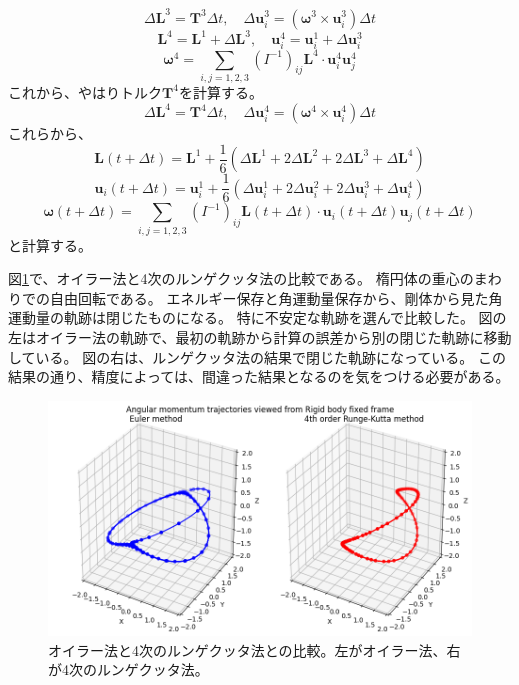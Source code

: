 \documentclass[a4paper,11pt]{jbook}
\begin{document}
\begin{equation}
\Delta \bm{L}^3=\bm{T}^3\Delta t, \quad \Delta\bm{u}_i^3=(\bm{\omega}^3\times\bm{u}_i^3)\Delta t
\end{equation}
\begin{equation}
\bm{L}^4=\bm{L}^1+\Delta \bm{L}^3,\quad\bm{u}_i^4=\bm{u}_i^1+\Delta\bm{u}_i^3
\end{equation}
\begin{equation}
 \bm{\omega}^4=\sum_{i,j=1,2,3}(I^{-1})_{ij}\bm{L}^4\cdot\bm{u}_i^4\bm{u}_j^4
\end{equation}
これから、やはりトルク$\bm{T}^4$を計算する。
\begin{equation}
\Delta \bm{L}^4=\bm{T}^4\Delta t, \quad \Delta\bm{u}_i^4=(\bm{\omega}^4\times\bm{u}_i^4)\Delta t
\end{equation}
これらから、
\begin{equation}
\bm{L}(t+\Delta t)=\bm{L}^1+\frac16(\Delta\bm{L}^1+2\Delta\bm{L}^2+2\Delta\bm{L}^3+\Delta\bm{L}^4)
\end{equation}
\begin{equation}
\bm{u}_i(t+\Delta t)=\bm{u}_i^1+\frac16(\Delta\bm{u}_i^1+2\Delta\bm{u}_i^2+2\Delta\bm{u}_i^3+\Delta\bm{u}_i^4)
\end{equation}
\begin{equation}
 \bm{\omega}(t+\Delta t)=\sum_{i,j=1,2,3}(I^{-1})_{ij}\bm{L}(t+\Delta t)\cdot\bm{u}_i(t+\Delta t)\bm{u}_j(t+\Delta t)
\end{equation}
と計算する。

図\ref{fig:4_2_2_integrator}で、オイラー法と4次のルンゲクッタ法の比較である。
楕円体の重心のまわりでの自由回転である。
エネルギー保存と角運動量保存から、剛体から見た角運動量の軌跡は閉じたものになる。
特に不安定な軌跡を選んで比較した。
図の左はオイラー法の軌跡で、最初の軌跡から計算の誤差から別の閉じた軌跡に移動している。
図の右は、ルンゲクッタ法の結果で閉じた軌跡になっている。
この結果の通り、精度によっては、間違った結果となるのを気をつける必要がある。
\begin{figure}[h]
\centering
  \includegraphics[clip,width=1.0\linewidth]{pict/4_2_2_integrator.png}
  \caption{オイラー法と4次のルンゲクッタ法との比較。左がオイラー法、右が4次のルンゲクッタ法。}
  \label{fig:4_2_2_integrator}
\end{figure}
\end{document}
